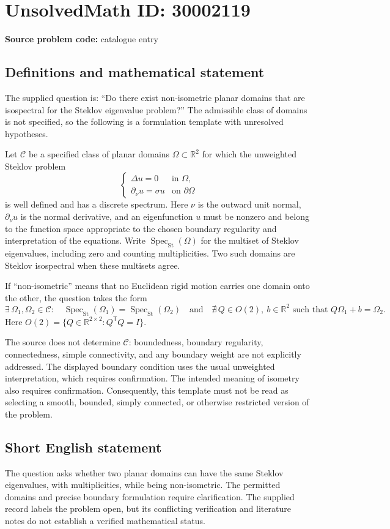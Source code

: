\documentclass[11pt]{article}
\newcommand{\R}{\mathbb{R}}
\begin{document}
\section*{UnsolvedMath ID: 30002119}
\textbf{Source problem code:} catalogue entry
\subsection{Definitions and mathematical statement}
The supplied question is: ``Do there exist non-isometric planar domains that are isospectral for the Steklov eigenvalue problem?'' The admissible class of domains is not specified, so the following is a formulation template with unresolved hypotheses.

Let \(\mathcal C\) be a specified class of planar domains \(\Omega\subset\R^2\) for which the unweighted Steklov problem
\[
\begin{cases}
\Delta u=0 & \text{in }\Omega,\\
\partial_{\nu}u=\sigma u & \text{on }\partial\Omega
\end{cases}
\]
is well defined and has a discrete spectrum. Here \(\nu\) is the outward unit normal, \(\partial_\nu u\) is the normal derivative, and an eigenfunction \(u\) must be nonzero and belong to the function space appropriate to the chosen boundary regularity and interpretation of the equations. Write \(\operatorname{Spec}_{\mathrm{St}}(\Omega)\) for the multiset of Steklov eigenvalues, including zero and counting multiplicities. Two such domains are Steklov isospectral when these multisets agree.

If ``non-isometric'' means that no Euclidean rigid motion carries one domain onto the other, the question takes the form
\[
\exists\,\Omega_1,\Omega_2\in\mathcal C:\quad
\operatorname{Spec}_{\mathrm{St}}(\Omega_1)
=\operatorname{Spec}_{\mathrm{St}}(\Omega_2)
\quad\text{and}\quad
\nexists\,Q\in O(2),\ b\in\R^2
\text{ such that }Q\Omega_1+b=\Omega_2.
\]
Here \(O(2)=\{Q\in\R^{2\times2}:Q^{\mathsf T}Q=I\}\).

The source does not determine \(\mathcal C\): boundedness, boundary regularity, connectedness, simple connectivity, and any boundary weight are not explicitly addressed. The displayed boundary condition uses the usual unweighted interpretation, which requires confirmation. The intended meaning of isometry also requires confirmation. Consequently, this template must not be read as selecting a smooth, bounded, simply connected, or otherwise restricted version of the problem.
\subsection{Short English statement}
The question asks whether two planar domains can have the same Steklov eigenvalues, with multiplicities, while being non-isometric. The permitted domains and precise boundary formulation require clarification. The supplied record labels the problem open, but its conflicting verification and literature notes do not establish a verified mathematical status.
\end{document}

